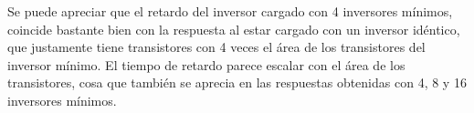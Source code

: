 \begin{table}[H]  %

    \setlength\arrayrulewidth{1.5pt}
    \def\clinecolor{\hhline{|>{\arrayrulecolor{white}}-%
    >{\arrayrulecolor{white}}|-|-|-|-|}}
	\caption{\footnotesize{Tiempos de retardo obtenidos para el inversor cargado con 4, 8 y 16 inversores mínimos.}}
	\label{table:delay_times}
\end{table}



Se puede apreciar que el retardo del inversor cargado con 4 inversores mínimos, coincide bastante bien con la respuesta al estar cargado con un inversor idéntico, que justamente tiene transistores con 4 veces el área de los transistores del inversor mínimo. El tiempo de retardo parece escalar con el área de los transistores, cosa que también se aprecia en las respuestas obtenidas con 4, 8 y 16 inversores mínimos.



\vfill
\clearpage





